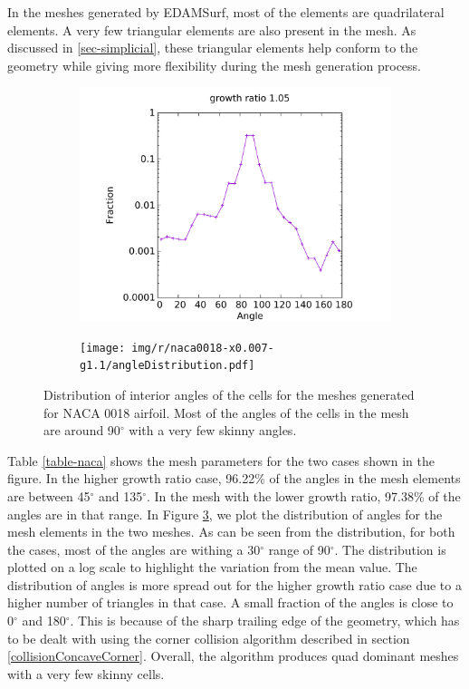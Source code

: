 In the meshes generated by EDAMSurf, most of the elements are quadrilateral elements. A very few triangular elements are also present in the mesh. As discussed in \ref{sec-simplicial}, these triangular elements help conform to the geometry while giving more flexibility during the mesh generation process.

\begin{figure}[!hbt]
	\centering
	\begin{subfigure}{0.5\textwidth}
		\centering
		\includegraphics[width=0.9\linewidth]{img/r/naca0018-x0.007-g1.05/angleDistribution.pdf}
		\caption{}
		\label{fig-dist-low}
	\end{subfigure}%
	\begin{subfigure}{0.5\textwidth}
		\centering
		\texttt{[image: img/r/naca0018-x0.007-g1.1/angleDistribution.pdf]}
		\caption{}
		\label{fig-dist-high}
	\end{subfigure}
	\caption{Distribution of interior angles of the cells for the meshes generated for NACA 0018 airfoil. Most of the angles of the cells in the mesh are around 90$^\circ$ with a very few skinny angles.}
	\label{fig-angle-distribution}
\end{figure}

Table \ref{table-naca} shows the mesh parameters for the two cases shown in the figure. In the higher growth ratio case, 96.22\% of the angles in the mesh elements are between 45$^\circ$ and 135$^\circ$. In the mesh with the lower growth ratio, 97.38\% of the angles are in that range. In Figure \ref{fig-angle-distribution}, we plot the distribution of angles for the mesh elements in the two meshes. As can be seen from the distribution, for both the cases, most of the angles are withing a 30$^\circ$ range of 90$^\circ$. The distribution is plotted on a log scale to highlight the variation from the mean value. The distribution of angles is more spread out for the higher growth ratio case due to a higher number of triangles in that case. A small fraction of the angles is close to 0$^\circ$ and 180$^\circ$. This is because of the sharp trailing edge of the geometry, which has to be dealt with using the corner collision algorithm described in section \ref{collisionConcaveCorner}. Overall, the algorithm produces quad dominant meshes with a very few skinny cells.

